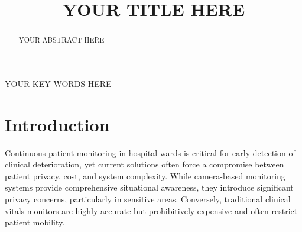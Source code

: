 \documentclass[conference]{IEEEtran}
\begin{document}
\title{YOUR TITLE HERE\\
}


\maketitle

\begin{abstract}
YOUR ABSTRACT HERE  
\end{abstract}

\begin{IEEEkeywords}
YOUR KEY WORDS HERE
\end{IEEEkeywords}

\section{Introduction}\label{introduction}
Continuous patient monitoring in hospital wards is critical for early detection of clinical deterioration, yet current solutions often force a compromise between patient privacy, cost, and system complexity. While camera-based monitoring systems provide comprehensive situational awareness, they introduce significant privacy concerns, particularly in sensitive areas. Conversely, traditional clinical vitals monitors are highly accurate but prohibitively expensive and often restrict patient mobility.
\end{document}
